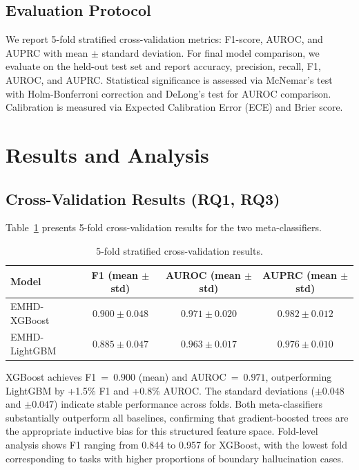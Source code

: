 \documentclass[11pt,a4paper]{article}
\begin{document}
\subsection{Evaluation Protocol}

We report 5-fold stratified cross-validation metrics: F1-score, AUROC, and AUPRC with mean $\pm$ standard deviation. For final model comparison, we evaluate on the held-out test set and report accuracy, precision, recall, F1, AUROC, and AUPRC. Statistical significance is assessed via McNemar's test with Holm-Bonferroni correction and DeLong's test for AUROC comparison. Calibration is measured via Expected Calibration Error (ECE) and Brier score.


\section{Results and Analysis}
\label{sec:results}

\subsection{Cross-Validation Results (RQ1, RQ3)}

Table~\ref{tab:cv} presents 5-fold cross-validation results for the two meta-classifiers.

\begin{table}[t]
\centering
\caption{5-fold stratified cross-validation results.}
\label{tab:cv}
\begin{tabular}{lccc}
\toprule
\textbf{Model} & \textbf{F1 (mean $\pm$ std)} & \textbf{AUROC (mean $\pm$ std)} & \textbf{AUPRC (mean $\pm$ std)} \\
\midrule
EMHD-XGBoost  & $\mathbf{0.900 \pm 0.048}$ & $\mathbf{0.971 \pm 0.020}$ & $\mathbf{0.982 \pm 0.012}$ \\
EMHD-LightGBM & $0.885 \pm 0.047$ & $0.963 \pm 0.017$ & $0.976 \pm 0.010$ \\
\bottomrule
\end{tabular}
\end{table}

XGBoost achieves F1~=~$0.900$ (mean) and AUROC~=~$0.971$, outperforming LightGBM by +1.5\% F1 and +0.8\% AUROC. The standard deviations ($\pm 0.048$ and $\pm 0.047$) indicate stable performance across folds. Both meta-classifiers substantially outperform all baselines, confirming that gradient-boosted trees are the appropriate inductive bias for this structured feature space. Fold-level analysis shows F1 ranging from 0.844 to 0.957 for XGBoost, with the lowest fold corresponding to tasks with higher proportions of boundary hallucination cases.
\end{document}
